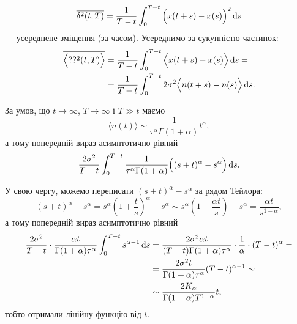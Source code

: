 
\begin{equation}
    \overline{\delta^2(t, T)}
    = \frac{1}{T - t} \int_0^{T - t} \Big( x(t + s) - x(s) \Big)^2 \mathop{}\!\mathrm{d} s
\end{equation}
--- усереднене зміщення (за часом). Усереднимо за сукупністю частинок:
\begin{equation}
    \begin{aligned}
        \overline{\Big\langle ??^2(t, T) \Big\rangle}
        &= \frac{1}{T - t} \int_0^{T - t} \Big\langle x(t + s) - x(s) \Big\rangle \mathop{}\!\mathrm{d} s = \\
        &= \frac{1}{T - t} \int_0^{T - t} 2 \sigma^2 \Big\langle n(t + s) - n(s) \Big\rangle \mathop{}\!\mathrm{d} s.
    \end{aligned}
\end{equation}

За умов, що $t \to \infty$, $T \to \infty$ і $T \gg t$ маємо
\begin{equation}
    \langle n(t) \rangle
    \sim \frac{1}{\tau^\alpha \Gamma(1 + \alpha)} t^\alpha,
\end{equation}
а тому попередній вираз асимптотично рівний
\begin{equation}
    \frac{2 \sigma^2}{T - t} \int_0^{T - t} \frac{1}{\tau^\alpha \Gamma(1 + \alpha)} \Big( (s + t)^\alpha - s^\alpha \Big) \mathop{}\!\mathrm{d} s.
\end{equation}

У свою чергу, можемо переписати $(s + t)^\alpha - s^\alpha$ за рядом Тейлора:
\begin{equation}
    (s + t)^\alpha - s^\alpha
    = s^\alpha \left( 1 + \frac{t}{s} \right)^\alpha - s^\alpha
    \sim s^\alpha \left( 1 + \frac{\alpha t}{s} \right) - s^\alpha
    = \frac{\alpha t}{s^{1 - \alpha}},
\end{equation}
а тому попередній вираз асимптотично рівний
\begin{equation}
    \begin{aligned}
        \frac{2 \sigma^2}{T - t} \cdot \frac{\alpha t}{\Gamma(1 + \alpha) \tau^\alpha} \int_0^{T - t} s^{\alpha - 1} \mathop{}\!\mathrm{d} s
        &= \frac{2 \sigma^2 \alpha t}{(T - t) \Gamma(1 + \alpha) \tau^\alpha} \cdot \frac{1}{\alpha} \cdot (T - t)^\alpha = \\
        &= \frac{2 \sigma^2 t}{\Gamma(1 + \alpha) \tau^\alpha} (T - t)^{\alpha - 1} \sim \\
        &\sim \frac{2 K_\alpha}{\Gamma(1 + \alpha) T^{1 - \alpha}} t,
    \end{aligned}
\end{equation}
тобто отримали лінійну функцію від $t$. \medskip

